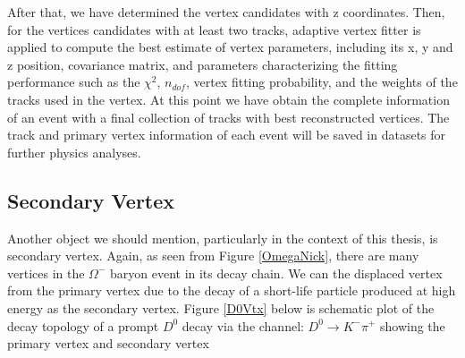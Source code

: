 After that, we have determined the vertex candidates with z coordinates. Then,  for the vertices candidates with at least two tracks, adaptive vertex fitter \cite{AVT} is applied to compute the best estimate of vertex parameters, including its x, y and z position, covariance matrix, and parameters characterizing the fitting performance such as the $\chi^2$, $n_{dof}$, vertex fitting probability, and the weights of the tracks used in the vertex. At this point we have obtain the complete information of an event with a final collection of tracks with best reconstructed vertices. The track and primary vertex information of each event will be saved in datasets for further physics analyses.

\subsection{Secondary Vertex}

Another object we should mention, particularly in the context of this thesis, is secondary vertex. Again, as seen from Figure \ref{OmegaNick}, there are many vertices in the $\Omega^-$ baryon event in its decay chain. We can the displaced vertex from the primary vertex due to the decay of a short-life particle produced at high energy as the secondary vertex. Figure \ref{D0Vtx} below is schematic plot of the decay topology of a prompt $D^0$ decay via the channel: $D^0 \rightarrow K^- \pi^+$ showing the primary vertex and secondary vertex  

